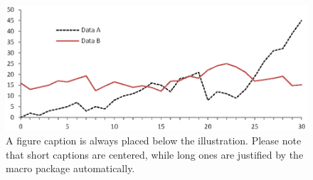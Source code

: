 \documentclass[../main.tex]{subfiles}
\begin{document}
\begin{figure}
    \includegraphics[width=\textwidth]{figures/fig1.eps}
    \caption{A figure caption is always placed below the illustration.
        Please note that short captions are centered, while long ones are
        justified by the macro package automatically.} \label{fig1}
\end{figure}
\end{document}

